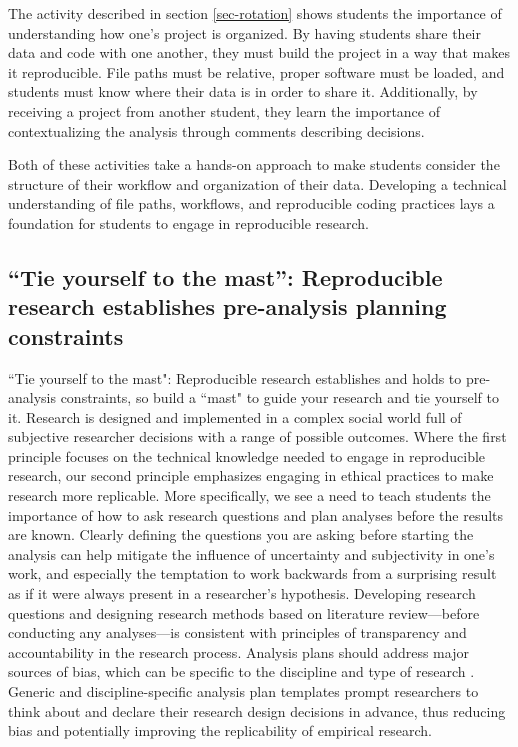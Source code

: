 \documentclass[
  12pt]{article}
\begin{document}
The activity described in section \ref{sec-rotation} shows students the importance of understanding how one's project is organized.
By having students share their data and code with one another, they must build the project in a way that makes it reproducible.
File paths must be relative, proper software must be loaded, and students must know where their data is in order to share it.
Additionally, by receiving a project from another student, they learn the importance of contextualizing the analysis through comments describing decisions.

Both of these activities take a hands-on approach to make students consider the structure of their workflow and organization of their data.
Developing a technical understanding of file paths, workflows, and reproducible coding practices lays a foundation for students to engage in reproducible research.

\subsection{``Tie yourself to the mast'': Reproducible research establishes pre-analysis \textbf{planning} constraints} \label{sec-mast}

``Tie yourself to the mast": Reproducible research establishes and holds to pre-analysis constraints, so build a ``mast" to guide your research and tie yourself to it.
Research is designed and implemented in a complex social world full of subjective researcher decisions with a range of possible outcomes.
Where the first principle focuses on the technical knowledge needed to engage in reproducible research, our second principle emphasizes engaging in ethical practices to make research more replicable.
More specifically, we see a need to teach students the importance of how to ask research questions and plan analyses before the results are known.
Clearly defining the questions you are asking before starting the analysis can help mitigate the influence of uncertainty and subjectivity in one's work, and especially the temptation to work backwards from a surprising result as if it were always present in a researcher's hypothesis.
Developing research questions and designing research methods based on literature review---before conducting any analyses---is consistent with principles of transparency and accountability in the research process.
Analysis plans should address major sources of bias, which can be specific to the discipline and type of research \cite{nosek_preregistration_2018}.
Generic and discipline-specific analysis plan templates prompt researchers to think about and declare their research design decisions in advance, thus reducing bias and potentially improving the replicability of empirical research. 
\end{document}
